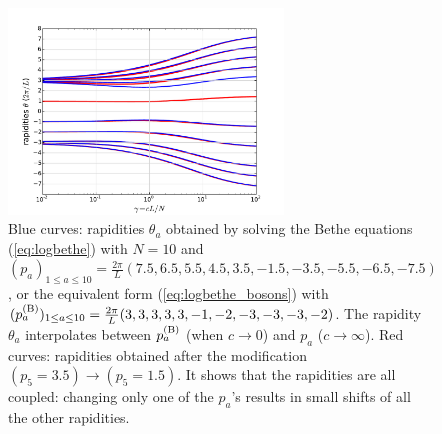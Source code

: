 \documentclass[onecolumn,amsfonts,showpacs,superscriptaddress]{revtex4-1}
\begin{document}
\begin{figure}
    \centering
    \includegraphics[width=0.65\textwidth]{figures/bethe_rapidities2.pdf}
    \caption{Blue curves: rapidities $\theta_a$ obtained by solving the Bethe equations (\ref{eq:logbethe}) with $N=10$ and $(p_a)_{1 \leq a\leq 10} = \frac{2\pi}{L}  (7.5,6.5,5.5,4.5,3.5,-1.5,-3.5, -5.5,-6.5,-7.5)$, or the equivalent form (\ref{eq:logbethe_bosons}) with $(p^{({\rm B})}_a)_{1 \leq a\leq 10} = \frac{2\pi}{L}  (3,3,3,3,3,-1,-2,-3,-3,-3,-2)$. The rapidity $\theta_a$ interpolates between $p_a^{({\rm B})}$ (when $c \rightarrow 0$) and $p_a$ ($c\rightarrow \infty$). Red curves: rapidities obtained after the modification $(p_5 = 3.5) \rightarrow (p_5 = 1.5)$. It shows that the rapidities are all coupled: changing only one of the $p_a$'s results in small shifts of all the other rapidities.}
    \label{fig:bethe_rapidities}
\end{figure}
\end{document}
